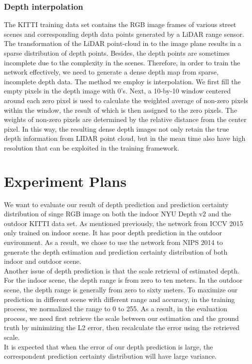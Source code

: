 \documentclass[letterpaper, 10 pt, conference]{ieeeconf}
\begin{document}
\subsubsection{Depth interpolation}
The KITTI training data set contains the RGB image frames of various street scenes and corresponding depth data points generated by a LiDAR range sensor. The transformation of the LiDAR point-cloud in to the image plane results in a sparse distribution of depth points. Besides, the depth points are sometimes incomplete due to the complexity in the scenes. Therefore, in order to train the network effectively, we need to generate a dense depth map from sparse, incomplete depth data. The method we employ is interpolation. We first fill the empty pixels in the depth image with 0’s. Next, a 10-by-10 window centered around each zero pixel is used to calculate the weighted average of non-zero pixels within the window, the result of which is then assigned to the zero pixels. The weights of non-zero pixels are determined by the relative distance from the center pixel. In this way, the resulting dense depth images not only retain the true depth information from LIDAR point cloud, but in the mean time also have high resolution that can be exploited in the training framework.
\section{Experiment Plans}
We want to evaluate our result of depth prediction and prediction certainty distribution of singe RGB image on both the indoor NYU Depth v2 and the outdoor KITTI data set. As mentioned previously, the network from ICCV 2015 only trained on indoor scene. It has poor depth prediction in the outdoor environment. As a result, we chose to use the network from NIPS 2014 to generate the depth estimation and prediction certainty distribution of both indoor and outdoor scene.\\

Another issue of depth prediction is that the scale retrieval of estimated depth. For the indoor scene, the depth range is from zero to ten meters. In the outdoor scene, the depth range is generally from zero to sixty meters. To maximize our prediction in different scene with different range and accuracy, in the training process, we normalized the range to 0 to 255. As a result, in the evaluation process, we need first retrieve the scale between our estimation and the ground truth by minimizing the L2 error, then recalculate the error using the retrieved scale. \\

It is expected that when the error of our depth prediction is large, the correspondent prediction certainty distribution will have large variance.


\end{document}
